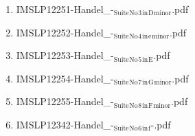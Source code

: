 \documentclass[11pt]{article}
\begin{document}
\begin{enumerate}
\begin{enumerate}
\begin{enumerate}
\item IMSLP12251-Handel\_-$_{\text{Suite}}$$_{\text{No}}$$_{\text{3}}$$_{\text{in}}$$_{\text{D}}$$_{\text{minor}}$.pdf
\label{sec-1-1-1-1-44-37-5-8-5}

\item IMSLP12252-Handel\_-$_{\text{Suite}}$$_{\text{No}}$$_{\text{4}}$$_{\text{in}}$$_{\text{e}}$$_{\text{minor}}$.pdf
\label{sec-1-1-1-1-44-37-5-8-6}

\item IMSLP12253-Handel\_-$_{\text{Suite}}$$_{\text{No}}$$_{\text{5}}$$_{\text{in}}$$_{\text{E}}$.pdf
\label{sec-1-1-1-1-44-37-5-8-7}

\item IMSLP12254-Handel\_-$_{\text{Suite}}$$_{\text{No}}$$_{\text{7}}$$_{\text{in}}$$_{\text{G}}$$_{\text{minor}}$.pdf
\label{sec-1-1-1-1-44-37-5-8-8}

\item IMSLP12255-Handel\_-$_{\text{Suite}}$$_{\text{No}}$$_{\text{8}}$$_{\text{in}}$$_{\text{F}}$$_{\text{minor}}$.pdf
\label{sec-1-1-1-1-44-37-5-8-9}

\item IMSLP12342-Handel\_-$_{\text{Suite}}$$_{\text{No}}$$_{\text{6}}$$_{\text{in}}$$_{\text{f}}$-.pdf
\label{sec-1-1-1-1-44-37-5-8-10}
\end{enumerate}
\end{enumerate}
\end{enumerate}
\end{document}
